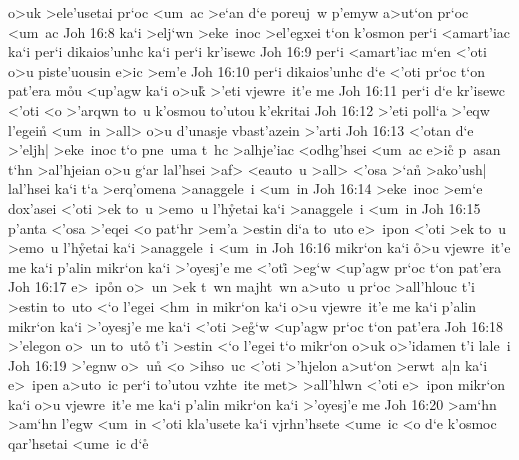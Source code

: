 o>uk
>ele'usetai
pr`oc
<um~ac
>e`an
d`e
poreuj~w
p'emyw
a>ut`on
pr`oc
<um~ac\bibvsend
\vs Joh 16:8
ka`i
>elj`wn
>eke~inoc
>el'egxei
t`on
k'osmon
per`i
<amart'iac
ka`i
per`i
dikaios'unhc
ka`i
per`i
kr'isewc\bibvsend
\vs Joh 16:9
per`i
<amart'iac
m`en
<'oti
o>u
piste'uousin
e>ic
>em'e\bibvsend
\vs Joh 16:10
per`i
dikaios'unhc
d`e
<'oti
pr`oc
t`on
pat'era
m\r{o}u
<up'agw
ka`i
o>uk\r{}
>'eti
vjewre~it'e
me\bibvsend
\vs Joh 16:11
per`i
d`e
kr'isewc
<'oti
<o
>'arqwn
to~u
k'osmou
to'utou
k'ekritai\bibvsend
\vs Joh 16:12
>'eti
poll`a
>'eqw
l'egein\r{}
<um~in
>all>
o>u
d'unasje
vbast'azein
>'arti\bibvsend
\vs Joh 16:13
<'otan
d`e
>'eljh|
>eke~inoc
t`o
pne~uma
t~hc
>alhje'iac
<odhg'hsei
<um~ac
e>ic\r{}
p~asan
t`hn
>al'hjeian
o>u
g`ar
lal'hsei
>af>
<eauto~u
>all>
<'osa
>`an\r{}
>ako'ush|
lal'hsei
ka`i
t`a
>erq'omena
>anaggele~i
<um~in\bibvsend
\vs Joh 16:14
>eke~inoc
>em`e
dox'asei
<'oti
>ek
to~u
>emo~u
l'h\r{y}etai
ka`i
>anaggele~i
<um~in\bibvsend
\vs Joh 16:15
p'anta
<'osa
>'eqei
<o
pat`hr
>em'a
>estin
di`a
to~uto
e>~ipon
<'oti
>ek
to~u
>emo~u
l'h\r{y}etai
ka`i
>anaggele~i
<um~in\bibvsend
\vs Joh 16:16
mikr`on
ka`i
\r{o}>u
vjewre~it'e
me
ka`i
p'alin
mikr`on
ka`i
>'oyesj'e
me
<'oti\r{}
>eg`w
<up'agw
pr`oc
t`on
pat'era\bibvsend
\vs Joh 16:17
e>~ip\r{o}n
o>~un
>ek
t~wn
majht~wn
a>uto~u
pr`oc
>all'hlouc
t'i
>estin
to~uto
<`o
l'egei
<hm~in
mikr`on
ka`i
o>u
vjewre~it'e
me
ka`i
p'alin
mikr`on
ka`i
>'oyesj'e
me
ka`i
<'oti
>e\r{g}`w
<up'agw
pr`oc
t`on
pat'era\bibvsend
\vs Joh 16:18
>'elegon
o>~un
to~uto\r{}
t'i
>estin
<`o
l'egei
t`o
mikr`on
o>uk
o>'idamen
t'i
lale~i\bibvsend
\vs Joh 16:19
>'egnw
o>~un\r{}
<o
>ihso~uc
<'oti
>'hjelon
a>ut`on
>erwt~a|n
ka`i
e>~ipen
a>uto~ic
per`i
to'utou
vzhte~ite
met>
>all'hlwn
<'oti
e>~ipon
mikr`on
ka`i
o>u
vjewre~it'e
me
ka`i
p'alin
mikr`on
ka`i
>'oyesj'e
me\bibvsend
\vs Joh 16:20
>am`hn
>am`hn
l'egw
<um~in
<'oti
kla'usete
ka`i
vjrhn'hsete
<ume~ic
<o
d`e
k'osmoc
qar'hsetai
<ume~ic
d`e\r{}
